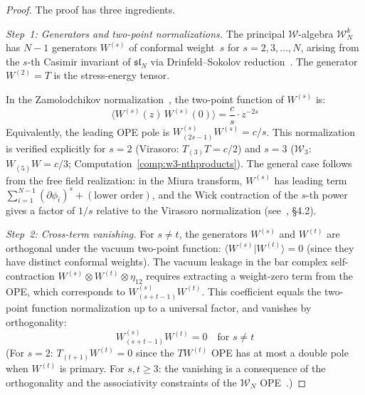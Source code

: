 \begin{proof}
The proof has three ingredients.

\emph{Step~1: Generators and two-point normalizations.}
The principal $\mathcal{W}$-algebra $\mathcal{W}_N^k$ has $N-1$ generators
$W^{(s)}$ of conformal weight~$s$ for $s = 2, 3, \ldots, N$, arising
from the $s$-th Casimir invariant of $\mathfrak{sl}_N$ via
Drinfeld--Sokolov reduction~\cite{FL88}.  The generator
$W^{(2)} = T$ is the stress-energy tensor.

In the Zamolodchikov normalization~\cite{Zamolodchikov}, the
two-point function of $W^{(s)}$ is:
\begin{equation}\label{eq:wn-2pt}
\langle W^{(s)}(z)\, W^{(s)}(0) \rangle = \frac{c}{s} \cdot z^{-2s}
\end{equation}
Equivalently, the leading OPE pole is
$W^{(s)}_{(2s-1)} W^{(s)} = c/s$.  This normalization is verified
explicitly for $s = 2$ (Virasoro: $T_{(3)}T = c/2$) and
$s = 3$ ($\mathcal{W}_3$: $W_{(5)}W = c/3$;
Computation~\ref{comp:w3-nthproducts}).  The general case follows from
the free field realization: in the Miura transform,
$W^{(s)}$ has leading term
$\sum_{i=1}^{N-1} (\partial\phi_i)^s + (\text{lower order})$,
and the Wick contraction of the $s$-th power gives a factor of
$1/s$ relative to the Virasoro normalization
(see~\cite{Bouwknegt-Schoutens}, \S4.2).

\emph{Step~2: Cross-term vanishing.}
For $s \neq t$, the generators $W^{(s)}$ and $W^{(t)}$ are
orthogonal under the vacuum two-point function:
$\langle W^{(s)} | W^{(t)} \rangle = 0$ (since they have distinct
conformal weights).  The vacuum leakage in the bar complex self-contraction
$W^{(s)} \otimes W^{(t)} \otimes \eta_{12}$ requires extracting a
weight-zero term from the OPE, which corresponds to
$W^{(s)}_{(s+t-1)} W^{(t)}$.  This coefficient equals the
two-point function normalization up to a universal factor, and vanishes
by orthogonality:
\begin{equation}
W^{(s)}_{(s+t-1)} W^{(t)} = 0 \quad \text{for } s \neq t
\end{equation}
(For $s = 2$: $T_{(t+1)} W^{(t)} = 0$ since the $TW^{(t)}$ OPE has
at most a double pole when $W^{(t)}$ is primary.
For $s, t \geq 3$: the vanishing is a consequence of the orthogonality
and the associativity constraints of the $\mathcal{W}_N$
OPE~\cite{Bouwknegt-Schoutens}.)


\end{proof}
